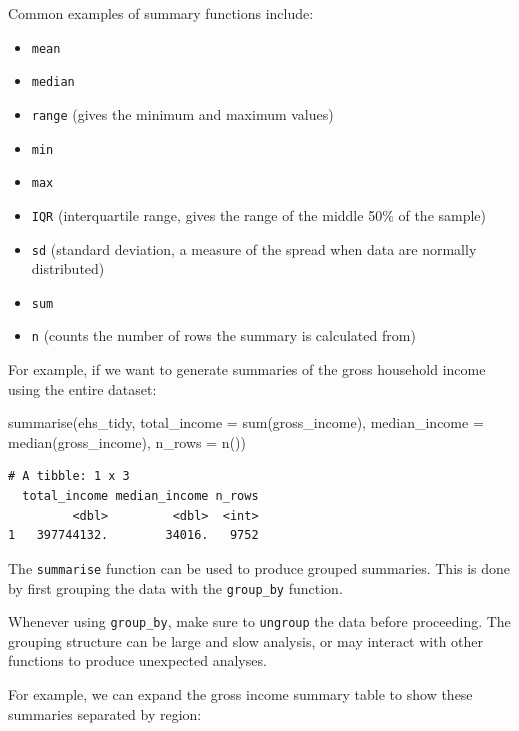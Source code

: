 \documentclass[
  letterpaper,
  DIV=11,
  numbers=noendperiod]{scrreprt}
\newenvironment{Shaded}{\begin{snugshade}}{\end{snugshade}}
\newcommand{\AttributeTok}[1]{\textcolor[rgb]{0.40,0.45,0.13}{#1}}
\newcommand{\FunctionTok}[1]{\textcolor[rgb]{0.28,0.35,0.67}{#1}}
\newcommand{\NormalTok}[1]{\textcolor[rgb]{0.00,0.23,0.31}{#1}}
\providecommand{\tightlist}{%
  \setlength{\itemsep}{0pt}\setlength{\parskip}{0pt}}\usepackage{longtable,booktabs,array}
\begin{document}
Common examples of summary functions include:

\begin{itemize}
\tightlist
\item
  \texttt{mean}
\item
  \texttt{median}
\item
  \texttt{range} (gives the minimum and maximum values)
\item
  \texttt{min}
\item
  \texttt{max}
\item
  \texttt{IQR} (interquartile range, gives the range of the middle 50\%
  of the sample)
\item
  \texttt{sd} (standard deviation, a measure of the spread when data are
  normally distributed)
\item
  \texttt{sum}
\item
  \texttt{n} (counts the number of rows the summary is calculated from)
\end{itemize}

For example, if we want to generate summaries of the gross household
income using the entire dataset:

\begin{Shaded}
\begin{Highlighting}[]
\FunctionTok{summarise}\NormalTok{(ehs\_tidy,}
          \AttributeTok{total\_income =} \FunctionTok{sum}\NormalTok{(gross\_income),}
          \AttributeTok{median\_income =} \FunctionTok{median}\NormalTok{(gross\_income),}
          \AttributeTok{n\_rows =} \FunctionTok{n}\NormalTok{())}
\end{Highlighting}
\end{Shaded}

\begin{verbatim}
# A tibble: 1 x 3
  total_income median_income n_rows
         <dbl>         <dbl>  <int>
1   397744132.        34016.   9752
\end{verbatim}

The \texttt{summarise} function can be used to produce grouped
summaries. This is done by first grouping the data with the
\texttt{group\_by} function.

Whenever using \texttt{group\_by}, make sure to \texttt{ungroup} the
data before proceeding. The grouping structure can be large and slow
analysis, or may interact with other functions to produce unexpected
analyses.

For example, we can expand the gross income summary table to show these
summaries separated by region:
\end{document}
